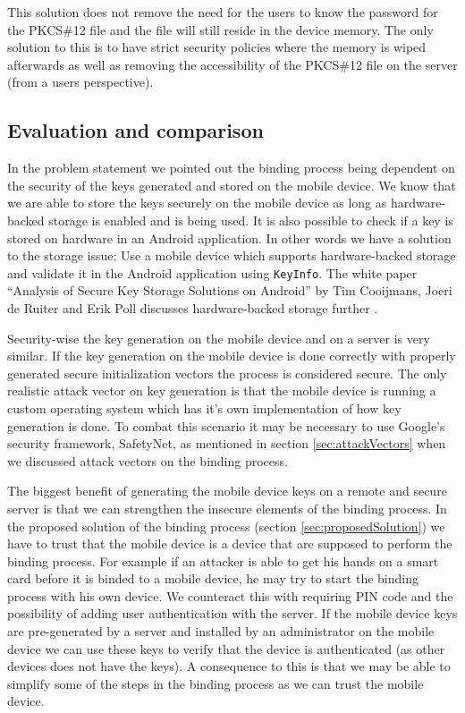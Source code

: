 This solution does not remove the need for the users to know the password for the PKCS\#12 file and the file will still reside in the device memory. The only solution to this is to have strict security policies where the memory is wiped afterwards as well as removing the accessibility of the PKCS\#12 file on the server (from a users perspective).

\subsection{Evaluation and comparison}
In the problem statement we pointed out the binding process being dependent on the security of the keys generated and stored on the mobile device. We know that we are able to store the keys securely on the mobile device as long as hardware-backed storage is enabled and is being used. It is also possible to check if a key is stored on hardware in an Android application. In other words we have a solution to the storage issue: Use a mobile device which supports hardware-backed storage and validate it in the Android application using \texttt{KeyInfo}. The white paper ``Analysis of Secure Key Storage Solutions on Android'' by Tim Cooijmans, Joeri de Ruiter and Erik Poll discusses hardware-backed storage further \cite{KeyStorage}.

Security-wise the key generation on the mobile device and on a server is very similar. If the key generation on the mobile device is done correctly with properly generated secure initialization vectors the process is considered secure. The only realistic attack vector on key generation is that the mobile device is running a custom operating system which has it's own implementation of how key generation is done. To combat this scenario it may be necessary to use Google's security framework, SafetyNet, as mentioned in section \ref{sec:attackVectors} when we discussed attack vectors on the binding process.

The biggest benefit of generating the mobile device keys on a remote and secure server is that we can strengthen the insecure elements of the binding process. In the proposed solution of the binding process (section \ref{sec:proposedSolution}) we have to trust that the mobile device is a device that are supposed to perform the binding process. For example if an attacker is able to get his hands on a smart card before it is binded to a mobile device, he may try to start the binding process with his own device. We counteract this with requiring PIN code and the possibility of adding user authentication with the server. If the mobile device keys are pre-generated by a server and installed by an administrator on the mobile device we can use these keys to verify that the device is authenticated (as other devices does not have the keys). A consequence to this is that we may be able to simplify some of the steps in the binding process as we can trust the mobile device.

